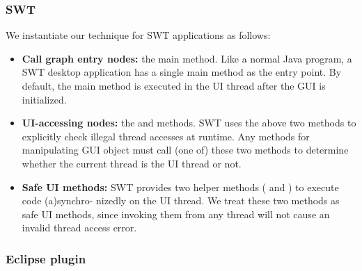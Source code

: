 \subsubsection{SWT}

 We instantiate our technique for SWT applications as follows:


\begin{itemize}

\item \textbf{Call graph entry nodes: } the main method. Like a normal Java program,
a SWT desktop application has a single main method as the entry point. By default,
the main method is executed in the UI thread after the GUI
is initialized.

\item \textbf{UI-accessing nodes: } the 
and   methods. SWT uses the above
two methods to explicitly check illegal thread accesses at runtime.
Any methods for manipulating GUI object must call (one of) these two methods
 to determine whether the current thread is the UI thread or not.

\item \textbf{Safe UI methods: } SWT provides two helper methods (
and ) to execute code (a)synchro-
nizedly on the UI thread.
 We treat these two methods as safe UI methods, since invoking
them from any thread 
will not cause an invalid thread access error.

\end{itemize}

\subsubsection{Eclipse plugin}

